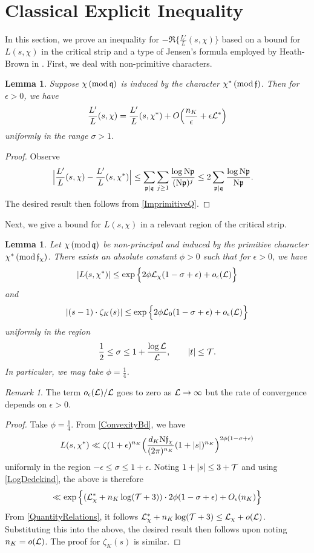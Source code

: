 \documentclass[12pt,psamsfonts]{amsart}
\newtheorem{lem}[thm]{Lemma}
\theoremstyle{definition}
\theoremstyle{remark}
\newtheorem*{rem*}{Remark}
\numberwithin{equation}{section}
\begin{document}
\section{Classical Explicit Inequality}
\label{ClassicalExpIneq}
In this section, we prove an inequality for $-\Re\{\frac{L'}{L}(s,\chi)\}$ based on a bound for $L(s,\chi)$ in the critical strip and a type of Jensen's formula employed by Heath-Brown in \cite[Section 3]{HBLinnik}. First, we deal with non-primitive characters. 
\begin{lem}
\label{ImprimitiveChar}
Suppose $\chi \, (\mathrm{mod} {\, \mathfrak{q}})$ is induced by the character $\chi^* \, (\mathrm{mod} {\, \mathfrak{f}})$. Then for $\epsilon > 0$, we have
\[
 \frac{L'}{L}(s,\chi) = \frac{L'}{L}(s,\chi^*) + O\Big(\frac{n_K}{\epsilon} + \epsilon \mathcal{L}^*\Big)
\]
uniformly in the range $\sigma > 1$. 
\end{lem}
\begin{proof} Observe 
\[
\begin{aligned}
& \Big| \frac{L'}{L}(s,\chi) - \frac{L'}{L}(s,\chi^*)\Big|  \leq  \sum_{ \mathfrak{p} \mid \mathfrak{q}} \sum_{j \geq 1} \frac{\log \mathrm{N}\mathfrak{p}}{(\mathrm{N}\mathfrak{p})^{j}}  \leq 2\sum_{\mathfrak{p} \mid \mathfrak{q}} \frac{\log \mathrm{N}\mathfrak{p}}{\mathrm{N}\mathfrak{p}}. 
 \end{aligned}
\]
The desired result then follows from \cref{ImprimitiveQ}. 
\end{proof}
Next, we give a bound for $L(s,\chi)$ in a relevant region of the critical strip.  
\begin{lem} \label{CriticalStripConstant} Let $\chi \, (\mathrm{mod} {\, \mathfrak{q}})$ be non-principal and induced by the primitive character $\chi^* \, (\mathrm{mod} {\, \mathfrak{f}_{\chi}})$. There exists an absolute constant $\phi > 0$ such that for $\epsilon > 0$,
we have
\[
|L(s,\chi^*)| \leq \exp\Big\{ 2\phi  \mathcal{L}_{\chi} (1-\sigma+\epsilon)  + o_{\epsilon}(\mathcal{L}) \Big\}
\]
and
\[
|(s-1) \cdot \zeta_K(s)| \leq  \exp\Big\{ 2\phi  \mathcal{L}_0 (1-\sigma+\epsilon)  + o_{\epsilon}(\mathcal{L}) \Big\}
\]
uniformly in the region
\[
\frac{1}{2} \leq \sigma \leq 1 + \frac{\log \mathcal{L}}{\mathcal{L}}, \qquad |t| \leq \mathcal{T}.
\]
In particular, we may take $\phi = \tfrac{1}{4}$. 
\end{lem}
\begin{rem*}
The term $o_{\epsilon}(\mathcal{L})/\mathcal{L}$ goes to zero as $\mathcal{L} \rightarrow \infty$ but the rate of convergence depends on $\epsilon > 0$.   
\end{rem*}

\begin{proof}  Take $\phi = \tfrac{1}{4}$. From \cref{ConvexityBd}, we have
\[
L(s,\chi^*) \ll  \zeta(1+\epsilon)^{n_K} \Big( \frac{d_K \mathrm{N}\mathfrak{f}_{\chi}}{ (2\pi)^{n_K}} (1+|s|)^{n_K} \Big)	^{2\phi(1-\sigma+\epsilon)}
\] 
uniformly in the region $-\epsilon \leq \sigma \leq 1+\epsilon$. Noting $1+|s| \leq 3+ \mathcal{T}$ and using \cref{LogDedekind}, the above is therefore
\[
\ll  \exp\Big\{ (\mathcal{L}_{\chi}^* + n_K\log( \mathcal{T}+3) ) \cdot 2\phi (1-\sigma+\epsilon) + O_{\epsilon}(n_K) \Big\}
\]
From \cref{QuantityRelations},  it follows $\mathcal{L}_{\chi}^* + n_K \log( \mathcal{T}+3) \leq \mathcal{L}_{\chi} + o(\mathcal{L})$. Substituting this into the above, the desired result then follows upon noting $n_K = o(\mathcal{L})$. The proof for $\zeta_K(s)$ is similar.
\end{proof}
\end{document}
